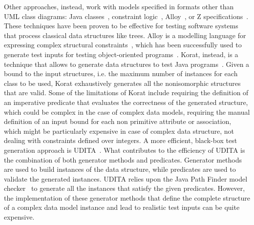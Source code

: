 Other approaches, instead, work with models specified in formats other than UML class diagrams:
Java classes~\cite{Boyapati-KORAT-ISSTA-2002,gligoric2010test}, constraint logic~\cite{Senni-CPLgeneration-TAP-2012}, Alloy~\cite{Khurshid-SpecificationBasedTesting-ASE-2004}, or Z specifications~\cite{Horcher-Z-1995}.
These techniques have been proven to be effective for testing software systems that process classical data structures like trees. 
Alloy is a modelling language for expressing complex structural constraints~\cite{Jackson:Alloy:2002},
which has been successfully used to generate test inputs for testing object-oriented programs~\cite{Khurshid-SpecificationBasedTesting-ASE-2004}.
Korat, instead, is a technique that allows to generate data structures to test Java programs~\cite{Boyapati-KORAT-ISSTA-2002}. Given a bound to the input structures, i.e. the maximum number of instances for each class to be used, Korat exhaustively generates all the nonisomorphic structures that are valid. 
Some of the limitations of Korat include requiring the definition of an imperative predicate that evaluates the correctness of the generated structure, which could be complex in the case of complex data models, requiring the manual definition of an input bound for each non primitive attribute or association, which might be particularly expensive in case of complex data structure,  not dealing with constraints defined over integers.
A more efficient, black-box test generation approach is UDITA~\cite{gligoric2010test}.
What contributes to the efficiency of UDITA is the combination of both generator methods and predicates.
Generator methods are used to build instances of the data structure, while predicates are used to validate the generated instances. UDITA relies upon the Java Path Finder model checker~\cite{Visser-JPF-2004} to generate all the instances that satisfy the given predicates. However, the implementation of these generator methods that define the complete structure of a complex data model instance and lead to realistic test inputs can be quite expensive. 

